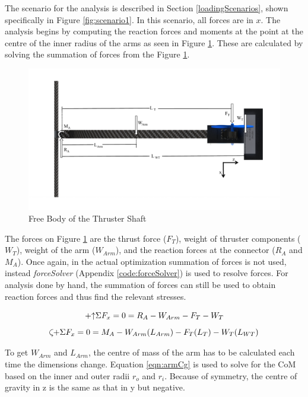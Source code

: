 \documentclass[../main.tex]{subfiles}
\begin{document}
The scenario for the analysis is described in Section \ref{loadingScenarios}, shown specifically in Figure \ref{fig:scenario1}. In this scenario, all forces are in $x$. The analysis begins by computing the reaction forces and moments at the point at the centre of the inner radius of the arms as seen in Figure \ref{fig:thrusterArmFBD}. These are calculated by solving the summation of forces from the Figure \ref{fig:thrusterArmFBD}.

\begin{figure}[H]
	\centering
	\includegraphics[width=.9\linewidth]{img/analysis/arm/thrusterArm.pdf}
	\caption{Free Body of the Thruster Shaft}
	\label{fig:thrusterArmFBD}
\end{figure}

The forces on Figure \ref{fig:thrusterArmFBD} are the thrust force ($F_T$), weight of thruster components ($W_T$), weight of the arm ($W_{Arm}$), and the reaction forces at the connector ($R_A$ and $M_A$). Once again, in the actual optimization summation of forces is not used, instead \textit{forceSolver} (Appendix \ref{code:forceSolver}) is used to resolve forces. For analysis done by hand, the summation of forces can still be used to obtain reaction forces and thus find the relevant stresses.

\begin{equation} \label{eqn:armFx}
\mathbin{+\mathord\uparrow} \Sigma F_x = 0 = R_A - W_{Arm} - F_T - W_T
\end{equation}
\begin{equation} \label{eqn:armMA}
\curveplus \Sigma F_x = 0 = M_A - W_{Arm}(L_{Arm}) - F_T(L_T) - W_T(L_{WT})
\end{equation}

To get $W_{Arm}$ and $L_{Arm}$, the centre of mass of the arm has to be calculated each time the dimensions change. Equation \ref{eqn:armCg} is used to solve for the CoM based on the inner and outer radii $r_o$ and $r_i$. Because of symmetry, the centre of gravity in z is the same as that in y but negative. 
\end{document}
